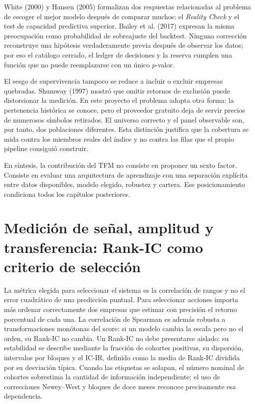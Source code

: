 White (2000) y Hansen (2005) formalizan dos respuestas relacionadas al problema de escoger el mejor
modelo después de comparar muchos: el \textit{Reality Check} y el test de capacidad predictiva
superior. Bailey et al. (2017) expresan la misma preocupación como probabilidad de sobreajuste del
backtest. Ninguna corrección reconstruye una hipótesis verdaderamente previa después de observar los
datos; por eso el catálogo cerrado, el ledger de decisiones y la reserva cumplen una función que no
puede reemplazarse con un único $p$-valor.

El sesgo de supervivencia tampoco se reduce a incluir o excluir empresas quebradas. Shumway (1997)
mostró que omitir retornos de exclusión puede distorsionar la medición. En este proyecto el problema
adopta otra forma: la pertenencia histórica se conoce, pero el proveedor gratuito deja de servir
precios de numerosos símbolos retirados. El universo correcto y el panel observable son, por tanto,
dos poblaciones diferentes. Esta distinción justifica que la cobertura se mida contra los miembros
reales del índice y no contra las filas que el propio pipeline consiguió construir.

En síntesis, la contribución del TFM no consiste en proponer un sexto factor. Consiste en evaluar una
arquitectura de aprendizaje con una separación explícita entre datos disponibles, modelo elegido,
robustez y cartera. Ese posicionamiento condiciona todos los capítulos posteriores.

\section{Medición de señal, amplitud y transferencia: Rank-IC como criterio de selección}

La métrica elegida para seleccionar el sistema es la correlación de rangos y no el error cuadrático
de una predicción puntual. Para seleccionar acciones importa más ordenar correctamente dos empresas
que estimar con precisión el retorno porcentual de cada una. La correlación de Spearman es además
robusta a transformaciones monótonas del score: si un modelo cambia la escala pero no el orden, su
Rank-IC no cambia. Un Rank-IC no debe presentarse aislado: su estabilidad se describe mediante la
fracción de cohortes positivas, su dispersión, intervalos por bloques y el IC-IR, definido como la
media de Rank-IC dividida por su desviación típica. Cuando las etiquetas se solapan, el número
nominal de cohortes sobrestima la cantidad de información independiente; el uso de correcciones
Newey--West y bloques de doce meses reconoce precisamente esa dependencia.

